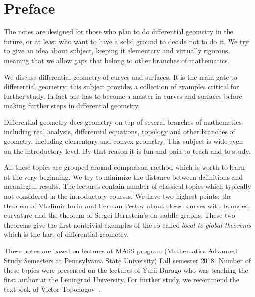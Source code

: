 
\chapter*{Preface}

The notes are designed for those who plan to do differential geometry in the future,
or at least who want to have a solid ground to decide not to do it.
We try to give an idea about subject, keeping it elementary and virtually rigorous, meaning that we allow gaps that belong to other branches of mathematics.

We discuss differential geometry of curves and surfaces.
It is the main gate to differential geometry;
this subject provides a collection of examples critical for further study.
In fact one has to become a master in curves and surfaces before making further steps in differential geometry.

Differential geometry does geometry on top of several branches of mathematics including real analysis, differential equations, topology and other branches of geometry, including elementary and convex geometry.
This subject is wide even on the introductory level. 
By that reason it is fun and pain to teach and to study.

All these topics are grouped around comparison method which is worth to learn at the very beginning.
We try to minimize the distance between definitions and meaningful results.
The lectures contain number of classical topics which typically not considered in the introductory courses.
We have two highest points: the theorem of Vladimir Ionin and Herman Pestov about closed curves with bounded curvature and the theorem of Sergei Bernstein's on saddle graphs.
These two theorems give the first nontrivial examples of the so called \emph{local to global theorems} which is the hart of differential geometry.

These notes are based on lectures at MASS program (Mathematics Advanced Study Semesters at Pennsylvania State University) Fall semester 2018.
Number of these topics were presented on the lectures of Yurii Burago who was teaching the first author at the Leningrad University.
For further study, we recommend the textbook of Victor Toponogov~\cite{toponogov}.
